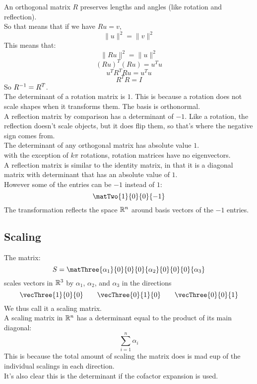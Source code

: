 \documentclass[12pt]{article}
\begin{document}
An orthogonal matrix $R$ preserves lengths and angles
(like rotation and reflection). \\
So that means that if we have $Ru = v$,
\[ \|u\|^2 = \|v\|^2 \]
This means that:
\[ \|Ru\|^2 = \|u\|^2 \]
\[ (Ru)^T(Ru) = u^Tu \]
\[ u^TR^TRu = u^Tu \]
\[ R^TR = I \]
So $R^{-1} = R^T$. \\

The determinant of a rotation matrix
is $1$.
This is because a rotation does not scale
shapes when it transforms them.
The basis is orthonormal. \\

A reflection matrix by comparison has a determinant
of $-1$. 
Like a rotation, the reflection doesn't scale objects,
but it does flip them, so that's where the negative
sign comes from. \\

The determinant of any orthogonal matrix
has absolute value $1$. \\

with the exception of $k\pi$ rotations,
rotation matrices have no eigenvectors. \\

A reflection matrix is similar to the identity
matrix, in that it is a diagonal matrix
with determinant that has an absolute
value of $1$. \\
However some of the entries can be $-1$
instead of $1$:
\[ \matTwo{1}{0}{0}{-1} \]
The transformation reflects the space $\mathbb{R}^n$
around basis vectors of the $-1$ entries.

\newpage

\subsection*{Scaling}

The matrix:
\[ S = \matThree{\alpha_1}{0}{0}
{0}{\alpha_2}{0}{0}{0}{\alpha_3} \]
scales vectors in $\mathbb{R}^3$
by $\alpha_1$, $\alpha_2$, and $\alpha_3$
in the directions
\[ \vecThree{1}{0}{0}
\qquad \vecThree{0}{1}{0}
\qquad \vecThree{0}{0}{1} \]
We thus call it a scaling matrix. \\

A scaling matrix in $\mathbb{R}^n$ has a determinant equal 
to the product of its main diagonal:
\[ \sum_{i=1}^{n}\alpha_i\]
This is because the total amount of scaling
the matrix does is mad eup of the individual
scalings in each direction. \\
It's also clear this is the determinant if the cofactor
expansion is used. \\
\end{document}

